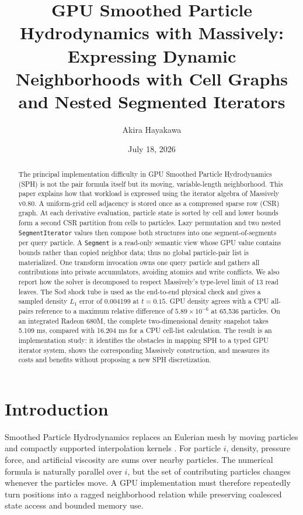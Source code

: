 \documentclass[a4paper,10pt]{article}
\title{GPU Smoothed Particle Hydrodynamics with Massively:\\
Expressing Dynamic Neighborhoods with Cell Graphs\\
and Nested Segmented Iterators}
\author{Akira Hayakawa}
\date{July 18, 2026}
\newcommand{\code}[1]{\texttt{#1}}
\begin{document}
\maketitle

\begin{abstract}
The principal implementation difficulty in GPU Smoothed Particle Hydrodynamics
(SPH) is not the pair formula itself but its moving, variable-length
neighborhood.  This paper explains how that workload is expressed using the
iterator algebra of Massively v0.80.  A uniform-grid cell adjacency is stored
once as a compressed sparse row (CSR) graph.  At each derivative evaluation,
particle state is sorted by cell and lower bounds form a second CSR partition
from cells to particles.  Lazy permutation and two nested
\code{SegmentIterator} values then compose both structures into one
segment-of-segments per query particle.  A \code{Segment} is a read-only semantic
view whose GPU value contains bounds rather than copied neighbor data; thus no
global particle-pair list is materialized.  One transform invocation owns one
query particle and gathers all contributions into private accumulators, avoiding
atomics and write conflicts.  We also report how the solver is decomposed to
respect Massively's type-level limit of 13 read leaves.  The Sod shock tube is
used as the end-to-end physical check and gives a sampled density $L_1$ error of
0.004199 at $t=0.15$.  GPU density agrees with a CPU all-pairs reference to a
maximum relative difference of $5.89\times10^{-6}$ at 65,536 particles.  On an
integrated Radeon 680M, the complete two-dimensional density snapshot takes
5.109 ms, compared with 16.204 ms for a CPU cell-list calculation.  The result
is an implementation study: it identifies the obstacles in mapping SPH to a
typed GPU iterator system, shows the corresponding Massively construction, and
measures its costs and benefits without proposing a new SPH discretization.
\end{abstract}

\section{Introduction}

Smoothed Particle Hydrodynamics replaces an Eulerian mesh by moving particles
and compactly supported interpolation kernels \citep{gingold1977,monaghan1992}.
For particle $i$, density, pressure force, and artificial viscosity are sums over
nearby particles.  The numerical formula is naturally parallel over $i$, but
the set of contributing particles changes whenever the particles move.  A GPU
implementation must therefore repeatedly turn positions into a ragged
neighborhood relation while preserving coalesced state access and bounded
memory use.
\end{document}
